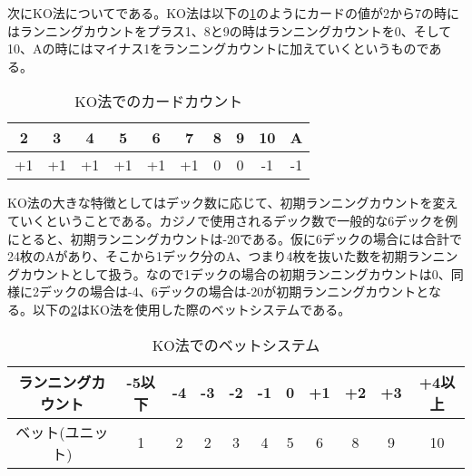次にKO法についてである。KO法は以下の\ref{koc}のようにカードの値が2から7の時にはランニングカウントをプラス1、8と9の時はランニングカウントを0、そして10、Aの時にはマイナス1をランニングカウントに加えていくというものである。

  \begin{table}[H]
    \centering
    \begin{tabular}{|c|c|c|c|c|c|c|c|c|c|} \hline
      2&3&4&5&6&7&8&9&10&A \\ \hline
      +1&+1&+1&+1&+1&+1&0&0&-1&-1 \\ \hline
    \end{tabular}
    \caption{KO法でのカードカウント}
    \label{koc}
  \end{table}

KO法の大きな特徴としてはデック数に応じて、初期ランニングカウントを変えていくということである。カジノで使用されるデック数で一般的な6デックを例にとると、初期ランニングカウントは-20である。仮に6デックの場合には合計で24枚のAがあり、そこから1デック分のA、つまり4枚を抜いた数を初期ランニングカウントとして扱う。なので1デックの場合の初期ランニングカウントは0、同様に2デックの場合は-4、6デックの場合は-20が初期ランニングカウントとなる。以下の\ref{kob}はKO法を使用した際のベットシステムである。

\begin{table}[H]
  \centering
  \begin{tabular}{|c|c|c|c|c|c|c|c|c|c|c|} \hline
    ランニングカウント&-5以下&-4&-3&-2&-1&0&+1&+2&+3&+4以上 \\ \hline
    ベット(ユニット)&1&2&2&3&4&5&6&8&9&10 \\ \hline
  \end{tabular}
  \caption{KO法でのベットシステム}
  \label{kob}
\end{table}

